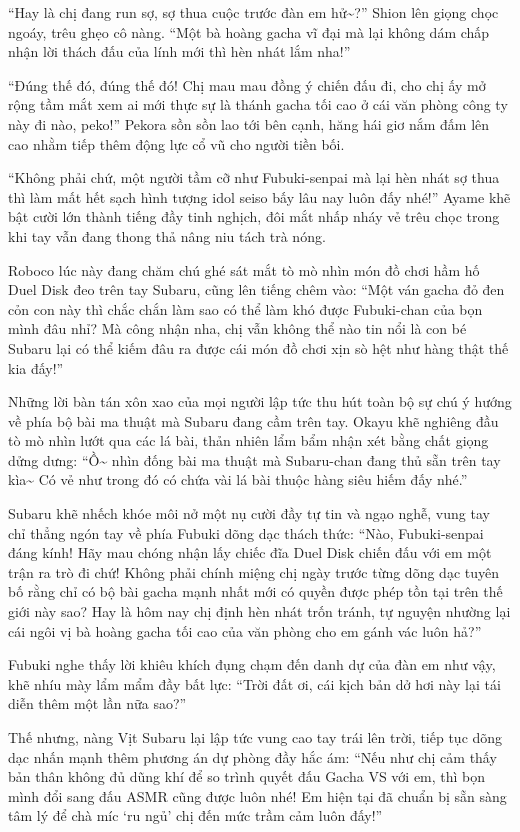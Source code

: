 \documentclass[../main.tex]{subfiles}
\begin{document}
``Hay là chị đang run sợ, sợ thua cuộc trước đàn em hử\~{}?'' Shion lên giọng chọc ngoáy, trêu ghẹo cô nàng. ``Một bà hoàng gacha vĩ đại mà lại không dám chấp nhận lời thách đấu của lính mới thì hèn nhát lắm nha!''

``Đúng thế đó, đúng thế đó! Chị mau mau đồng ý chiến đấu đi, cho chị ấy mở rộng tầm mắt xem ai mới thực sự là thánh gacha tối cao ở cái văn phòng công ty này đi nào, peko!'' Pekora sồn sồn lao tới bên cạnh, hăng hái giơ nắm đấm lên cao nhằm tiếp thêm động lực cổ vũ cho người tiền bối.

``Không phải chứ, một người tầm cỡ như Fubuki-senpai mà lại hèn nhát sợ thua thì làm mất hết sạch hình tượng idol seiso bấy lâu nay luôn đấy nhé!'' Ayame khẽ bật cười lớn thành tiếng đầy tinh nghịch, đôi mắt nhấp nháy vẻ trêu chọc trong khi tay vẫn đang thong thả nâng niu tách trà nóng.

Roboco lúc này đang chăm chú ghé sát mắt tò mò nhìn món đồ chơi hầm hố Duel Disk đeo trên tay Subaru, cũng lên tiếng chêm vào: ``Một ván gacha đỏ đen cỏn con này thì chắc chắn làm sao có thể làm khó được Fubuki-chan của bọn mình đâu nhỉ? Mà công nhận nha, chị vẫn không thể nào tin nổi là con bé Subaru lại có thể kiếm đâu ra được cái món đồ chơi xịn sò hệt như hàng thật thế kia đấy!''

Những lời bàn tán xôn xao của mọi người lập tức thu hút toàn bộ sự chú ý hướng về phía bộ bài ma thuật mà Subaru đang cầm trên tay. Okayu khẽ nghiêng đầu tò mò nhìn lướt qua các lá bài, thản nhiên lẩm bẩm nhận xét bằng chất giọng dửng dưng: ``Ồ\~{} nhìn đống bài ma thuật mà Subaru-chan đang thủ sẵn trên tay kìa\~{} Có vẻ như trong đó có chứa vài lá bài thuộc hàng siêu hiếm đấy nhé.''

Subaru khẽ nhếch khóe môi nở một nụ cười đầy tự tin và ngạo nghễ, vung tay chỉ thẳng ngón tay về phía Fubuki dõng dạc thách thức: ``Nào, Fubuki-senpai đáng kính! Hãy mau chóng nhận lấy chiếc đĩa Duel Disk chiến đấu với em một trận ra trò đi chứ! Không phải chính miệng chị ngày trước từng dõng dạc tuyên bố rằng chỉ có bộ bài gacha mạnh nhất mới có quyền được phép tồn tại trên thế giới này sao? Hay là hôm nay chị định hèn nhát trốn tránh, tự nguyện nhường lại cái ngôi vị bà hoàng gacha tối cao của văn phòng cho em gánh vác luôn hả?''

Fubuki nghe thấy lời khiêu khích đụng chạm đến danh dự của đàn em như vậy, khẽ nhíu mày lẩm mẩm đầy bất lực: ``Trời đất ơi, cái kịch bản dở hơi này lại tái diễn thêm một lần nữa sao?''

Thế nhưng, nàng Vịt Subaru lại lập tức vung cao tay trái lên trời, tiếp tục dõng dạc nhấn mạnh thêm phương án dự phòng đầy hắc ám: ``Nếu như chị cảm thấy bản thân không đủ dũng khí để so trình quyết đấu Gacha VS với em, thì bọn mình đổi sang đấu ASMR cũng được luôn nhé! Em hiện tại đã chuẩn bị sẵn sàng tâm lý để chà míc `ru ngủ' chị đến mức trầm cảm luôn đấy!''
\end{document}
